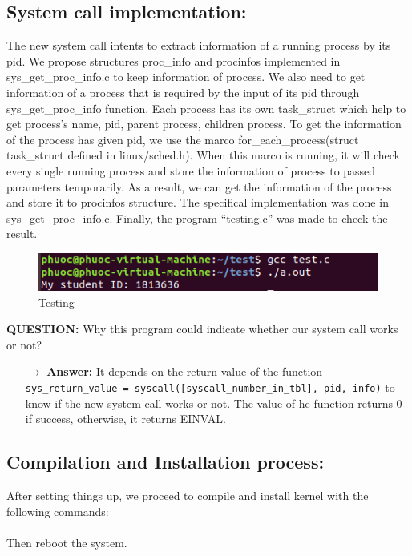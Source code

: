 \documentclass[a4paper]{article}
\begin{document}
\subsection{System call implementation:}
The new system call intents to extract information of a running process by its pid. We propose structures proc\_info and procinfos implemented in sys\_get\_proc\_info.c to keep information of process. We also need to get information of a process that is required by the input of its pid through sys\_get\_proc\_info function. Each process has its own task\_struct which help to get process’s name, pid, parent process, children process. To get the information of the process has given pid, we use the marco for\_each\_process(struct task\_struct defined in linux/sched.h). When this marco is running, it will check every single running process and store the information of process to passed parameters temporarily. As a result, we can get the information of the process and store it to procinfos structure. The specifical implementation was done in sys\_get\_proc\_info.c. Finally, the program ``testing.c'' was made to check the result.\\
\begin{figure}[h!]
\begin{center}
\includegraphics[width=14cm]{9.png}
\caption{Testing}
\end{center}
\end{figure}
\newpage
\begin{mdframed}[hidealllines=true,backgroundcolor=blue!10]
\textbf{QUESTION:} Why this program could indicate whether our system call works or not? 
\begin{itemize}
\item[$\rightarrow$] \textbf{Answer:}
It depends on the return value of the function\\
\texttt{sys\_return\_value = syscall([syscall\_number\_in\_tbl], pid, info)} to know if the new system call works or not. The value of he function returns 0 if success, otherwise, it returns EINVAL.
\end{itemize}
\end{mdframed}

\subsection{Compilation and Installation process:}
After setting things up, we proceed to compile and install kernel with the following commands:
\noindent{}\\
\\
Then reboot the system.
\end{document}
